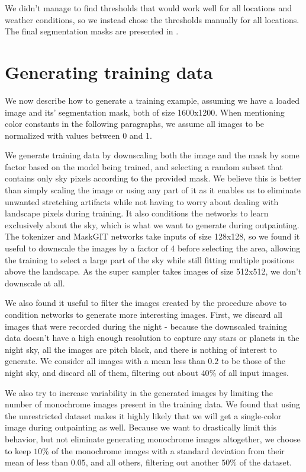 We didn't manage to find thresholds that would work well for all locations and weather conditions, so we instead chose the thresholds manually for all locations. The final segmentation masks are presented in .



\section{Generating training data}

We now describe how to generate a training example, assuming we have a loaded image and its' segmentation mask, both of size 1600x1200. When mentioning color constants in the following paragraphs, we assume all images to be normalized with values between 0 and 1.

We generate training data by downscaling both the image and the mask by some factor based on the model being trained, and selecting a random subset that contains only sky pixels according to the provided mask. We believe this is better than simply scaling the image or using any part of it as it enables us to eliminate unwanted stretching artifacts while not having to worry about dealing with landscape pixels during training. It also conditions the networks to learn exclusively about the sky, which is what we want to generate during outpainting. The tokenizer and MaskGIT networks take inputs of size 128x128, so we found it useful to downscale the images by a factor of 4 before selecting the area, allowing the training to select a large part of the sky while still fitting multiple positions above the landscape. As the super sampler takes images of size 512x512, we don't downscale at all.

We also found it useful to filter the images created by the procedure above to condition networks to generate more interesting images. First, we discard all images that were recorded during the night - because the downscaled training data doesn't have a high enough resolution to capture any stars or planets in the night sky, all the images are pitch black, and there is nothing of interest to generate. We consider all images with a mean less than $0.2$ to be those of the night sky, and discard all of them, filtering out about $40\%$ of all input images.

We also try to increase variability in the generated images by limiting the number of monochrome images present in the training data. We found that using the unrestricted dataset makes it highly likely that we will get a single-color image during outpainting as well. Because we want to drastically limit this behavior, but not eliminate generating monochrome images altogether, we choose to keep $10\%$ of the monochrome images with a standard deviation from their mean of less than $0.05$, and all others, filtering out another $50\%$ of the dataset. 

